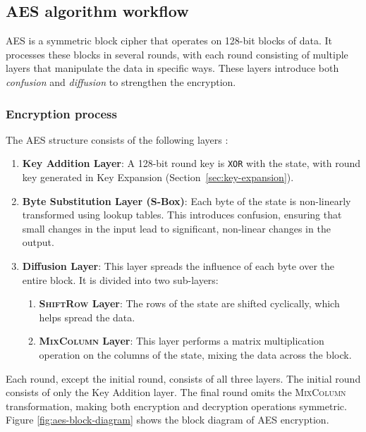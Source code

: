 \subsection{AES algorithm workflow}

\Gls{AES} is a symmetric block cipher that operates on 128-bit blocks of data.
It processes these blocks in several rounds, with each round consisting of multiple layers that manipulate the data in specific ways. 
These layers introduce both \textit{confusion} and \textit{diffusion} to strengthen the encryption.

\subsubsection{Encryption process}

The AES structure consists of the following layers \cite{Paar2024}:
\begin{enumerate}
    \item \textbf{Key Addition Layer}:
    A 128-bit round key is \texttt{XOR} with the state, with round key generated in Key Expansion (Section~\ref{sec:key-expansion}).

    \item \textbf{Byte Substitution Layer (S-Box)}:
    Each byte of the state is non-linearly transformed using lookup tables. 
    This introduces confusion, ensuring that small changes in the input lead to significant, non-linear changes in the output.
    
    \item \textbf{Diffusion Layer}:
    This layer spreads the influence of each byte over the entire block. 
    It is divided into two sub-layers:
    \begin{enumerate}
        \item \textbf{\textsc{ShiftRow} Layer}: The rows of the state are shifted cyclically, which helps spread the data. %
        \item \textbf{\textsc{MixColumn} Layer}: This layer performs a matrix multiplication operation on the columns of the state, mixing the data across the block. %
    \end{enumerate}
\end{enumerate}

Each round, except the initial round, consists of all three layers. 
The initial round consists of only the Key Addition layer.
The final round omits the \textsc{MixColumn} transformation, making both encryption and decryption operations symmetric.
Figure \ref{fig:aes-block-diagram} shows the block diagram of AES encryption.

